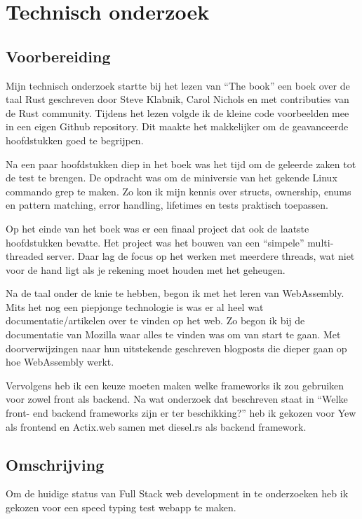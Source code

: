 \chapter{Technisch onderzoek}

\section{Voorbereiding}

Mijn technisch onderzoek startte bij het lezen van “The book” een boek over de taal Rust geschreven
door Steve Klabnik, Carol Nichols en met contributies van de Rust community. Tijdens het lezen
volgde ik de kleine code voorbeelden mee in een eigen Github repository. Dit maakte het makkelijker
om de geavanceerde hoofdstukken goed te begrijpen. 

Na een paar hoofdstukken diep in het boek was het tijd om de geleerde zaken tot de test te brengen.
De opdracht was om de miniversie van het gekende Linux commando grep te maken. Zo kon ik mijn kennis
over structs, ownership, enums en pattern matching, error handling, lifetimes en tests praktisch
toepassen.  

Op het einde van het boek was er een finaal project dat ook de laatste hoofdstukken bevatte. Het
project was het bouwen van een “simpele” multi-threaded server. Daar lag de focus op het werken met
meerdere threads, wat niet voor de hand ligt als je rekening moet houden met het geheugen. 

Na de taal onder de knie te hebben, begon ik met het leren van WebAssembly. Mits het nog een
piepjonge technologie is was er al heel wat documentatie/artikelen over te vinden op het web. Zo
begon ik bij de documentatie van Mozilla waar alles te vinden was om van start te gaan. Met
doorverwijzingen naar hun uitstekende geschreven blogposts die dieper gaan op hoe WebAssembly werkt. 

Vervolgens heb ik een keuze moeten maken welke frameworks ik zou gebruiken voor zowel front als
backend. Na wat onderzoek dat beschreven staat in “Welke front- end backend frameworks zijn er ter
beschikking?” heb ik gekozen voor Yew als frontend en Actix.web samen met diesel.rs als backend
framework.

\clearpage

\section{Omschrijving}

Om de huidige status van Full Stack web development in te onderzoeken heb ik gekozen voor een speed
typing test webapp te maken.

